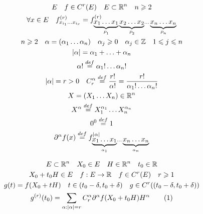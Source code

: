 \documentclass[main]{subfiles}
\begin{document}
    \begin{gather*}
        E \quad f \in C^r(E) \quad E \subset \mathbb{R}^n \quad n \geqslant 2 \\
        \forall x \in E \quad f^{(r)}_{x_{i_1} \ldots x_{i_r}} = f^{(r)}_{\underbrace{x_1 \ldots x_1}_{P_1} \underbrace{x_2 \ldots x_2}_{P_2} \ldots \underbrace{x_n \ldots x_n}_{P_n}} \\
        n \geqslant 2 \quad \alpha = (\alpha_1 \ldots \alpha_n) \quad \alpha_j \geqslant 0 \quad \alpha_j \in \mathbb{Z} \quad 1 \leqslant j \leqslant n \\
        |\alpha| = \alpha_1 + \ldots + \alpha_n \\
        \alpha! \stackrel{def}{=} \alpha_1! \ldots \alpha_n! \\
        |\alpha| = r > 0 \quad C^\alpha_r \stackrel{def}{=} \frac{r!}{\alpha!} = \frac{r!}{\alpha_1! \ldots \alpha_n!} \\
        X = (X_1 \ldots X_n) \in \mathbb{R}^n \\
        X^\alpha \stackrel{def}{=} X_1^{\alpha_1} \ldots X_n^{\alpha_n} \\
        0^0 \stackrel{def}{=} 1 \\
        \partial^{\alpha}f(x) \stackrel{def}{=} f^{|\alpha|}_{\underbrace{x_1 \ldots x_1}_{\alpha_1} \ldots \underbrace{x_n \ldots x_n}_{\alpha_n}} 
    \end{gather*}
    \begin{theorem}
    \begin{gather*}
        E \subset \mathbb{R}^n \quad X_0 \in E \quad H \in \mathbb{R}^n \quad t_0 \in \mathbb{R} \\
        X_0 + t_0H \in E \quad f: E \rightarrow \mathbb{R} \quad f \in C^r(E) \quad r \geqslant 1 \\
        g(t) = f(X_0 + tH) \quad t \in (t_0 - \delta, t_0 + \delta) \quad g \in C^r((t_0 - \delta, t_0 + \delta)) \\
        g^{(r)}(t_0) = \sum_{\alpha : |\alpha| = r} C^\alpha_r \partial^\alpha f(X_0 + t_0H)H^\alpha  \tag{1}
    \end{gather*}
\end{theorem}
\end{document}
